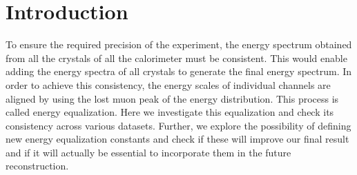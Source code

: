 \documentclass[article,accept,moreauthors,pdftex,10pt,a4paper]{../MDPI_template/Definitions/mdpi}
\begin{document}

\section{Introduction}
\noindent To ensure the required precision of the experiment, the energy spectrum obtained 
from all the crystals of all the calorimeter must be consistent. This would enable 
adding the energy spectra of all crystals to generate the final energy spectrum. 
In order to achieve this consistency, the energy scales of individual channels are aligned
by using the lost muon peak of the energy distribution. This process is called energy equalization. 
Here we investigate this equalization and check its consistency across various datasets. Further, we 
explore the possibility of defining new energy equalization constants and check if these will improve 
our final result and if it will actually be essential to incorporate them in the future reconstruction.
\end{document}
